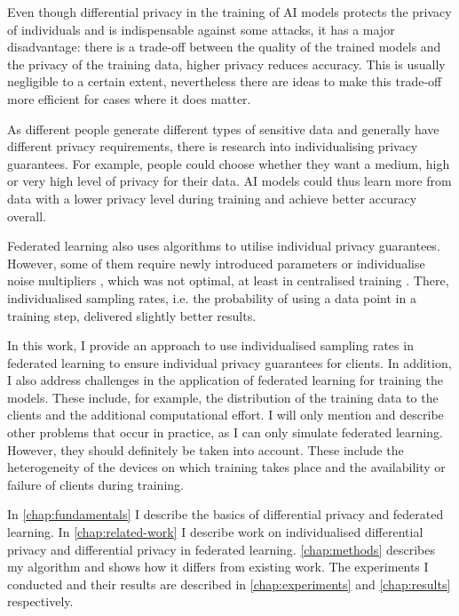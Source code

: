 Even though differential privacy in the training of AI models protects the privacy of individuals and is indispensable against some attacks, it has a major disadvantage: there is a trade-off between the quality of the trained models and the privacy of the training data, higher privacy reduces accuracy. This is usually negligible to a certain extent, nevertheless there are ideas to make this trade-off more efficient for cases where it does matter. 

As different people generate different types of sensitive data and generally have different privacy requirements, there is research into individualising privacy guarantees. For example, people could choose whether they want a medium, high or very high level of privacy for their data. AI models could thus learn more from data with a lower privacy level during training and achieve better accuracy overall.

Federated learning also uses algorithms to utilise individual privacy guarantees. However, some of them require newly introduced parameters \parencite{shen:2023} or individualise noise multipliers \parencite{aldaghri:2023}, which was not optimal, at least in centralised training \parencite{boenisch:2023}. There, individualised sampling rates, i.e. the probability of using a data point in a training step, delivered slightly better results.

In this work, I provide an approach to use individualised sampling rates in federated learning to ensure individual privacy guarantees for clients. In addition, I also address challenges in the application of federated learning for training the models. These include, for example, the distribution of the training data to the clients and the additional computational effort. I will only mention and describe other problems that occur in practice, as I can only simulate federated learning. However, they should definitely be taken into account. These include the heterogeneity of the devices on which training takes place and the availability or failure of clients during training.

In \autoref{chap:fundamentals} I describe the basics of differential privacy and federated learning. In \autoref{chap:related-work} I describe work on individualised differential privacy and differential privacy in federated learning. \autoref{chap:methods} describes my algorithm and shows how it differs from existing work. The experiments I conducted and their results are described in \autoref{chap:experiments} and \autoref{chap:results} respectively.